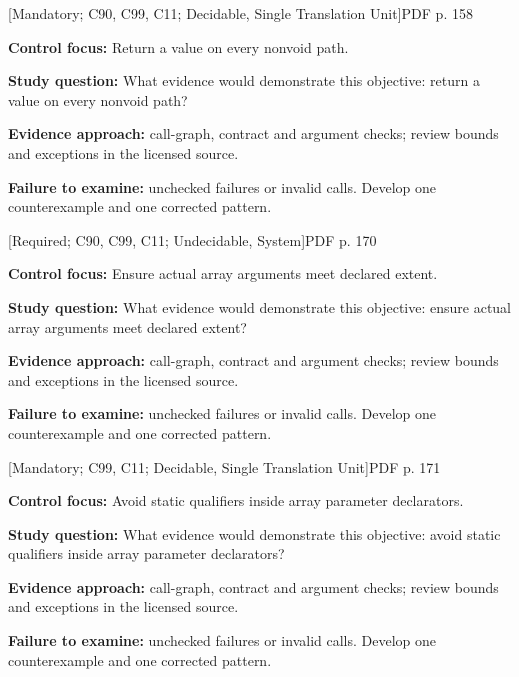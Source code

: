 \documentclass[10pt,letterpaper]{article}
\begin{document}
\smallskip
{}
 \textsf{\footnotesize [Mandatory; C90, C99, C11; Decidable, Single Translation Unit]}\hfill{\footnotesize PDF p. 158}\par
\textbf{Control focus:} Return a value on every nonvoid path.\par
\textbf{Study question:} What evidence would demonstrate this objective: return a value on every nonvoid path?\par
\textbf{Evidence approach:} call-graph, contract and argument checks; review bounds and exceptions in the licensed source.\par
\textbf{Failure to examine:} unchecked failures or invalid calls. Develop one counterexample and one corrected pattern.\par
\smallskip
{}
 \textsf{\footnotesize [Required; C90, C99, C11; Undecidable, System]}\hfill{\footnotesize PDF p. 170}\par
\textbf{Control focus:} Ensure actual array arguments meet declared extent.\par
\textbf{Study question:} What evidence would demonstrate this objective: ensure actual array arguments meet declared extent?\par
\textbf{Evidence approach:} call-graph, contract and argument checks; review bounds and exceptions in the licensed source.\par
\textbf{Failure to examine:} unchecked failures or invalid calls. Develop one counterexample and one corrected pattern.\par
\smallskip
{}
 \textsf{\footnotesize [Mandatory; C99, C11; Decidable, Single Translation Unit]}\hfill{\footnotesize PDF p. 171}\par
\textbf{Control focus:} Avoid static qualifiers inside array parameter declarators.\par
\textbf{Study question:} What evidence would demonstrate this objective: avoid static qualifiers inside array parameter declarators?\par
\textbf{Evidence approach:} call-graph, contract and argument checks; review bounds and exceptions in the licensed source.\par
\textbf{Failure to examine:} unchecked failures or invalid calls. Develop one counterexample and one corrected pattern.\par
\smallskip
{}
\end{document}
